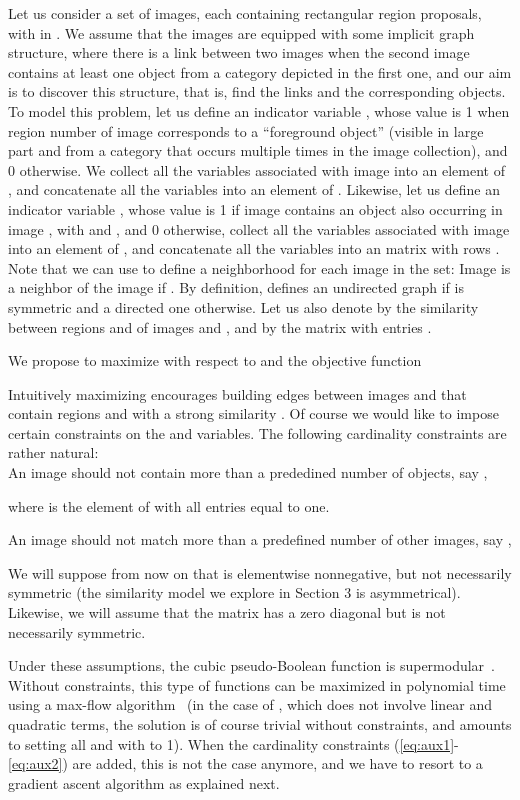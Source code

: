 \documentclass[10pt,twocolumn,letterpaper]{article}
\numberwithin{theorem}{section}
\begin{document}
Let us consider a set of  images, each containing  rectangular
region proposals, with  in .  We assume that the images are
equipped with some implicit graph structure, where there is a link
between two images when the second image contains at least one object from a category depicted in the first one,
and our aim is to discover this structure, that is, find the links and the
corresponding objects.  To model this problem, let us define an
indicator variable , whose value is 1 when region number  of
image  corresponds to a ``foreground object'' (visible in large part and from a category that occurs multiple times in the image collection), and 0 otherwise. We
collect all the variables  associated with image  into an
element  of , and concatenate all the variables
 into an element  of . Likewise,
let us define an indicator variable , whose value is 1 if
image  contains an object also occurring in image , with  and , and 0 otherwise,
collect all the variables  associated with image  into an
element  of , and concatenate all the variables 
into an  matrix  with rows . Note that we can use
 to define a neighborhood for each image in the set: Image  is a
neighbor of the image  if . By definition,  defines
an undirected graph if  is symmetric and a directed one
otherwise. Let us also denote by  the similarity between
regions  and  of images  and , and by  the
 matrix with entries .

We propose to maximize with respect to  and  the objective
function

Intuitively maximizing  encourages building edges between
images  and  that contain regions  and  with a strong
similarity .  Of course we would like to impose certain
constraints on the  and  variables. The following cardinality
constraints are rather natural:\\
\noindent An image should not contain more than a prededined
number of objects, say ,

where  is the element of  with all
entries equal to one.

\noindent An image should not match more than a predefined
number of other images, say ,


 We will suppose from now on that 
is elementwise nonnegative, but not necessarily symmetric (the similarity model we explore in Section 3 is asymmetrical). Likewise,
we will assume that the matrix  has a zero diagonal but is not
necessarily symmetric.



Under these assumptions, the cubic pseudo-Boolean function  is
supermodular~\cite{BoHa02}.  Without constraints, this type of
functions can be maximized in polynomial time using a max-flow
algorithm~\cite{BiMi85} (in the case of , which does not
involve linear and quadratic terms, the solution is of course trivial
without constraints, and amounts to setting all  and  with  to 1).  When
the cardinality constraints (\ref{eq:aux1}-\ref{eq:aux2}) are
added, this is not the case anymore, and we have to resort to a
gradient ascent algorithm as explained next.
\end{document}
